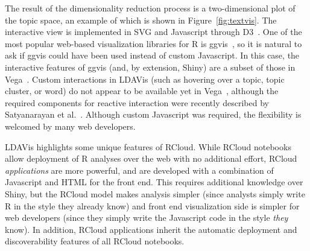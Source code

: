 The result of the dimensionality reduction process is a
two-dimensional plot of the topic space, an example of which is shown in
Figure~\ref{fig:textvis}. The interactive view is implemented in SVG
and Javascript through D3~\cite{Bostock:2011:DDD}. One of the most
popular web-based visualization libraries for R is ggvis~\cite{ggvis},
so it is natural to ask if ggvis could have been used instead of
custom Javascript. In this case, the interactive features of ggvis
(and, by extension, Shiny) are a subset of those in Vega~\cite{vega}.
Custom interactions in LDAVis (such as hovering over a topic,
topic cluster, or word) do not appear to be available yet in Vega~\cite{vega},
although the required components for reactive interaction were
recently described by Satyanarayan et
al.~\cite{Satyanarayan:2014:DID}.
Although custom Javascript was required, the flexibility is welcomed
by many web developers.

LDAVis highlights some unique features of RCloud.
While RCloud notebooks allow deployment of R analyses over
the web with no additional effort, RCloud \emph{applications} are more
powerful, and are developed with a combination of Javascript and HTML
for the front end. This requires additional knowledge over Shiny, but
the RCloud model makes analysis simpler (since analysts
simply write R in the style they already know)
and front end visualization side is simpler for web
developers (since they simply write the Javascript code in
the style \emph{they} know). In addition, RCloud applications
inherit the automatic deployment and discoverability features of
all RCloud notebooks.

%
